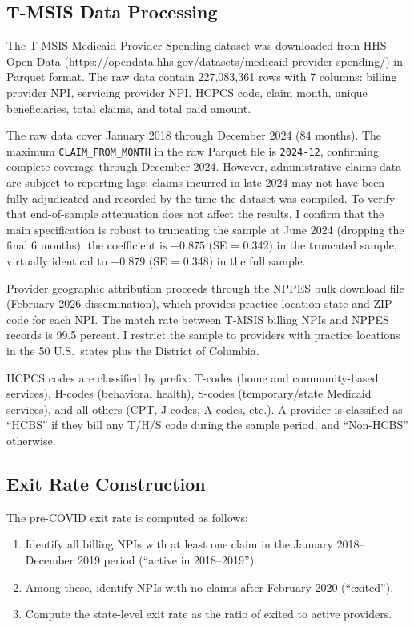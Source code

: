 \documentclass[12pt]{article}
\begin{document}
\subsection{T-MSIS Data Processing}

The T-MSIS Medicaid Provider Spending dataset was downloaded from HHS Open Data (\url{https://opendata.hhs.gov/datasets/medicaid-provider-spending/}) in Parquet format. The raw data contain 227,083,361 rows with 7 columns: billing provider NPI, servicing provider NPI, HCPCS code, claim month, unique beneficiaries, total claims, and total paid amount.

The raw data cover January 2018 through December 2024 (84 months). The maximum \texttt{CLAIM\_FROM\_MONTH} in the raw Parquet file is \texttt{2024-12}, confirming complete coverage through December 2024. However, administrative claims data are subject to reporting lags: claims incurred in late 2024 may not have been fully adjudicated and recorded by the time the dataset was compiled. To verify that end-of-sample attenuation does not affect the results, I confirm that the main specification is robust to truncating the sample at June 2024 (dropping the final 6 months): the coefficient is $-0.875$ (SE = 0.342) in the truncated sample, virtually identical to $-0.879$ (SE = 0.348) in the full sample.

Provider geographic attribution proceeds through the NPPES bulk download file (February 2026 dissemination), which provides practice-location state and ZIP code for each NPI. The match rate between T-MSIS billing NPIs and NPPES records is 99.5 percent. I restrict the sample to providers with practice locations in the 50 U.S.\ states plus the District of Columbia.

HCPCS codes are classified by prefix: T-codes (home and community-based services), H-codes (behavioral health), S-codes (temporary/state Medicaid services), and all others (CPT, J-codes, A-codes, etc.). A provider is classified as ``HCBS'' if they bill any T/H/S code during the sample period, and ``Non-HCBS'' otherwise.

\subsection{Exit Rate Construction}

The pre-COVID exit rate is computed as follows:
\begin{enumerate}
\item Identify all billing NPIs with at least one claim in the January 2018--December 2019 period (``active in 2018--2019'').
\item Among these, identify NPIs with no claims after February 2020 (``exited'').
\item Compute the state-level exit rate as the ratio of exited to active providers.
\end{enumerate}
\end{document}

